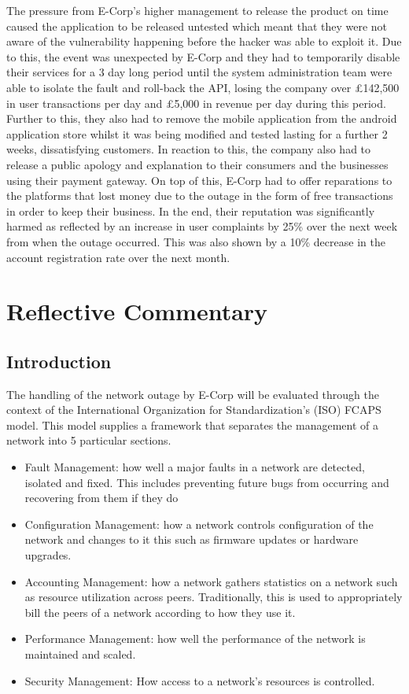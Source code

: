 \documentclass[]{report}
\begin{document}
The pressure from E-Corp's higher management to release the product on time caused the application to be released untested which meant that they were not aware of the vulnerability happening before the hacker was able to exploit it. Due to this, the event was unexpected by E-Corp and they had to temporarily disable their services for a 3 day long period until the system administration team were able to isolate the fault and roll-back the API, losing the company over £142,500 in user transactions per day and £5,000 in revenue per day during this period. Further to this, they also had to remove the mobile application from the android application store whilst it was being modified and tested lasting for a further 2 weeks, dissatisfying customers. In reaction to this, the company also had to release a public apology and explanation to their consumers and the businesses using their payment gateway. On top of this, E-Corp had to offer reparations to the platforms that lost money due to the outage in the form of free transactions in order to keep their business. In the end, their reputation was significantly harmed as reflected by an increase in user complaints by 25\% over the next week from when the outage occurred. This was also shown by a 10\% decrease in the account registration rate over the next month. 

\chapter{Reflective Commentary}

\section{Introduction}
The handling of the network outage by E-Corp will be evaluated through the context of the International Organization for Standardization's (ISO) FCAPS model. This model supplies a framework that separates the management of a network into 5 particular sections.

\begin{itemize}
	\item Fault Management:
	how well a major faults in a network are detected, isolated and fixed. This includes preventing future bugs from occurring and recovering from them if they do
	\item Configuration Management:
	how a network controls configuration of the network and changes to it this such as firmware updates or hardware upgrades.
	\item Accounting Management:
	how a network gathers statistics on a network such as resource utilization across peers. Traditionally, this is used to appropriately bill the peers of a network according to how they use it.
	\item Performance Management:
	how well the performance of the network is maintained and scaled.
	\item Security Management:
	How access to a network's resources is controlled.
\end{itemize}
\end{document}
